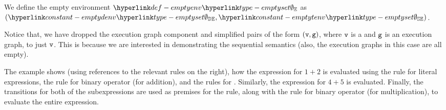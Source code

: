 \hypertarget{def-emptyenv}{}
We define the empty environment $\emptyenv$ as $(\emptydenv, \emptytenv)$.

Notice that, we have dropped the execution graph component and simplified pairs of the form $(\vv,\vg)$,
where $\vv$ is a \nativevalueterm{}  and $\vg$ is an execution graph, to just $\vv$.
This is because we are interested in demonstrating the sequential semantics (also, the execution graphs
in this case are all empty).

The example shows (using references to the relevant rules on the right), how the expression for $1+2$ is evaluated
using the rule for literal expressions, the rule for binary operator (for addition), and the rules for \binopexpressionsterm{}.
Similarly, the expression for $4+5$ is evaluated.
Finally, the transitions for both of the subexpressions are used as premises for the \binopexpressionterm{}
rule, along with the rule for binary operator (for multiplication), to evaluate the entire expression.

\begin{mathpar}
\end{mathpar}

\begin{mathpar}
\end{mathpar}

